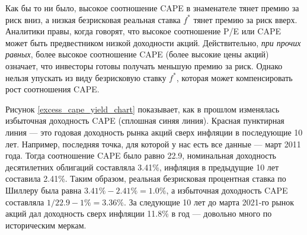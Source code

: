 Как бы то ни было, высокое соотношение CAPE в знаменателе тянет премию за риск 
вниз, а низкая безрисковая реальная ставка $f^*$ тянет премию за риск вверх. 
Аналитики правы, когда говорят, что высокое соотношение P/E или CAPE 
может быть предвестником низкой доходности акций. Действительно, \textit{при 
прочих равных}, более высокое соотношение CAPE (более высокие цены акций) 
означает, что инвесторы готовы получать меньшую премию за риск. Однако нельзя 
упускать из виду безрисковую ставку $f^*$, которая может компенсировать рост 
соотношения CAPE.

Рисунок \ref{excess_cape_yield_chart} показывает, как в прошлом изменялась 
избыточная доходность CAPE (сплошная синяя линия). Красная пунктирная линия 
--- это годовая доходность рынка акций сверх инфляции в последующие 10 лет. 
Например, последняя точка, для которой у нас есть все данные --- март 2011 
года. Тогда соотношение CAPE было равно 22.9, номинальная доходность 
десятилетних облигаций составляла 3.41\%, инфляция в предыдущие 10 лет 
составила 2.41\%. 
Таким образом, реальная безрисковая процентная ставка по Шиллеру была равна 
$3.41\% - 2.41\% = 1.0\%$, а избыточная доходность CAPE составляла $1/22.9 - 
1\% = 3.36\%$. За следующие 10 лет до марта 2021-го рынок акций дал доходность 
сверх инфляции 11.8\% в год --- довольно много по историческим меркам.




